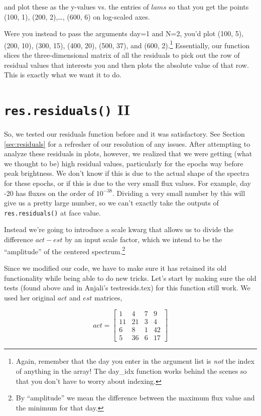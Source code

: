 \documentclass{article}
\begin{document}
and plot these as the y-values vs. the entries of $lams$ so that you
get the points (100, 1), (200, 2),\ldots, (600, 6) on log-scaled axes.

Were you instead to pass the arguments day=1 and N=2, you'd plot (100,
5), (200, 10), (300, 15), (400, 20), (500, 37), and (600,
2).\footnote{Again, remember that the day you enter in the argument
  list is \emph{not} the index of anything in the array!  The day\_idx
  function works behind the scenes so that you don't have to worry
  about indexing.}  Essentially, our function slices the
three-dimensional matrix of all the residuals to pick out the row of
residual values that interests you and then plots the absolute value
of that row.  This is exactly what we want it to do.

\section{\texttt{res.residuals()} II}
\label{sec:residuals2}

So, we tested our residuals function before and it was satisfactory.
See Section \ref{sec:residuals} for a refresher of our resolution of
any issues.  After attempting to analyze these residuals in plots,
however, we realized that we were getting (what we thought to be) high
residual values, particularly for the epochs way before peak
brightness.  We don't know if this is due to the actual shape of the
spectra for these epochs, or if this is due to the very small flux
values.  For example, day -20 has fluxes on the order of $10^{-38}$.
Dividing a very small number by this will give us a pretty large
number, so we can't exactly take the outputs of \verb|res.residuals()|
at face value.

Instead we're going to introduce a scale kwarg that allows us to
divide the difference $act-est$ by an input scale factor, which we
intend to be the ``amplitude'' of the centered spectrum.\footnote{By
  ``amplitude'' we mean the difference between the maximum flux value
  and the minimum for that day.}

Since we modified our code, we have to make sure it has retained its
old functionality while being able to do new tricks.  Let's start by
making sure the old tests (found above and in Anjali's
testresids.tex) for this function still work.  We used her original
$act$ and $est$ matrices,

\[act=\left[\begin{array}{cccc}
    1 & 4 & 7 & 9 \\
    11 & 21 & 3 & 4 \\
    6 & 8 & 1 & 42 \\
    5 & 36 & 6 & 17
\end{array} \right] \]
\end{document}
